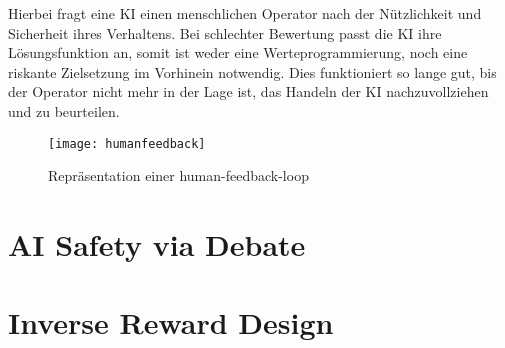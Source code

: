 Hierbei fragt eine KI einen menschlichen Operator nach der Nützlichkeit und Sicherheit ihres Verhaltens. Bei schlechter Bewertung passt die KI ihre Lösungsfunktion an, somit ist weder eine Werteprogrammierung, noch eine riskante Zielsetzung im Vorhinein notwendig.  Dies funktioniert so lange gut, bis der Operator nicht mehr in der Lage ist, das Handeln der KI nachzuvollziehen und zu beurteilen. 

\begin{figure}
  \texttt{[image: humanfeedback]}
  \caption{Repräsentation einer human-feedback-loop}
  \label{humanfeedbackimg}
\end{figure}

\section{AI Safety via Debate}
\section{Inverse Reward Design}




%



